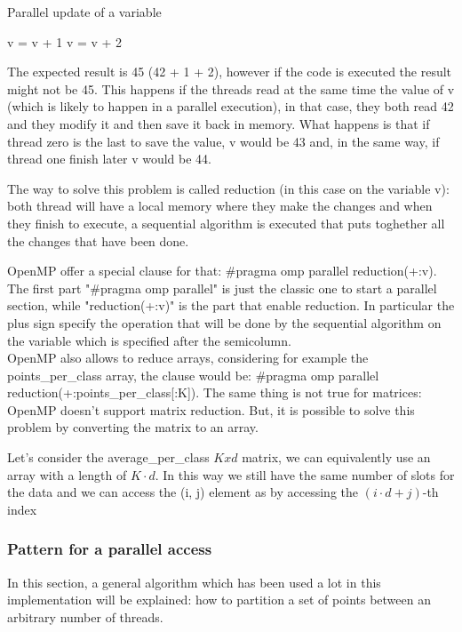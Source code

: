 \documentclass{report}
\begin{document}
\begin{minipage}[b]{0.48\textwidth}
    \begin{algorithm}[H]
        \caption{Parallel update of a variable}
        \begin{algorithmic}
            \State v = v + 1
            \State v = v + 2
            \EndIf
        \end{algorithmic}
    \end{algorithm}

    The expected result is 45 (42 + 1 + 2), however if the code is executed the result might not be 45. This happens if the threads read at the same time the value of v (which is likely to happen in a parallel execution), in that case, they both read 42 and they modify it and then save it back in memory. What happens is that if thread zero is the last to save the value, v would be 43 and, in the same way, if thread one finish later v would be 44.

    The way to solve this problem is called reduction (in this case on the variable v): both thread will have a local memory where they make the changes and when they finish to execute, a sequential algorithm is executed that puts toghether all the changes that have been done.

    OpenMP offer a special clause for that: \#pragma omp parallel reduction(+:v). The first part "\#pragma omp parallel" is just the classic one to start a parallel section, while "reduction(+:v)" is the part that enable reduction. In particular the plus sign specify the operation that will be done by the sequential algorithm on the variable which is specified after the semicolumn. \\
    
    OpenMP also allows to reduce arrays, considering for example the points\_per\_class array, the clause would be: \#pragma omp parallel reduction(+:points\_per\_class[:K]). The same thing is not true for matrices: OpenMP doesn't support matrix reduction. But, it is possible to solve this problem by converting the matrix to an array.

    Let's consider the average\_per\_class $Kxd$ matrix, we can equivalently use an array with a length of $K\cdot d$. In this way we still have the same number of slots for the data and we can access the (i, j) element as by accessing the $(i \cdot d + j)$-th index

    \subsubsection*{Pattern for a parallel access}
    In this section, a general algorithm which has been used a lot in this implementation will be explained: how to partition a set of points between an arbitrary number of threads.


\end{minipage}
\end{document}
